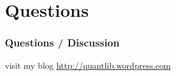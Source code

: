 \documentclass{beamer}
\begin{document}
\section{Questions}

\begin{frame}[fragile]
\frametitle{Questions / Discussion}
\begin{center}
visit my blog \href{http://quantlib.wordpress.com}{http://quantlib.wordpress.com}
\end{center}
\end{frame}
\end{document}
